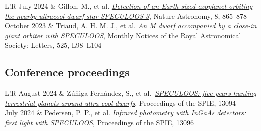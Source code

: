 \documentclass{article}
\begin{document}
\begin{longtable}{L!{\vrule}R}
    July 2024 &
    Gillon, M., et al.
    \href{https://ui.adsabs.harvard.edu/abs/2024NatAs...8..865G/abstract}{\textit{Detection of an Earth-sized exoplanet orbiting the nearby ultracool dwarf star SPECULOOS-3}},
    Nature Astronomy, 8, 865--878 \\

    October 2023 &
    Triaud, A. H. M. J., et al.
    \href{https://ui.adsabs.harvard.edu/abs/2023MNRAS.525L..98T/abstract}{\textit{An M dwarf accompanied by a close-in giant orbiter with SPECULOOS}},
    Monthly Notices of the Royal Astronomical Society: Letters, 525, L98--L104 \\

    \end{longtable}

\subsection*{Conference proceedings}
\begin{tabular}{L!{\vrule}R}
    August 2024 &
    Zúñiga-Fernández, S., et al.\ 
    \href{https://ui.adsabs.harvard.edu/abs/2024SPIE13094E..13Z/abstract}{\textit{SPECULOOS: five years hunting terrestrial planets around ultra-cool dwarfs}},
    Proceedings of the SPIE, 13094 \\ %

    July 2024 &
    Pedersen, P. P., et al.
    \href{https://ui.adsabs.harvard.edu/abs/2024SPIE13096E..3XP/abstract}{\textit{Infrared photometry with InGaAs detectors: first light with SPECULOOS}},
    Proceedings of the SPIE, 13096 \\
\end{tabular}
\end{document}
